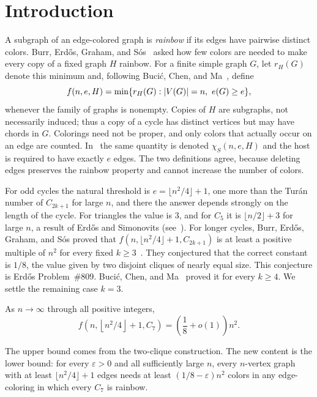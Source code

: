 \section{Introduction}\label{sec:introduction}
A subgraph of an edge-colored graph is \emph{rainbow} if its edges have pairwise distinct colors. Burr, Erd\H{o}s, Graham, and S\'os~\cite{BEGS1989} asked how few colors are needed to make every copy of a fixed graph $H$ rainbow. For a finite simple graph $G$, let $r_H(G)$ denote this minimum and, following Buci\'c, Chen, and Ma~\cite{BCM2026}, define
\begin{equation}\label{eq:fdefinition}
 f(n,e,H)=\min\{r_H(G):\lvert V(G)\rvert=n,\ e(G)\ge e\},
\end{equation}
whenever the family of graphs is nonempty. Copies of $H$ are subgraphs, not necessarily induced; thus a copy of a cycle has distinct vertices but may have chords in $G$. Colorings need not be proper, and only colors that actually occur on an edge are counted. In~\cite{BEGS1989} the same quantity is denoted $\chi_S(n,e,H)$ and the host is required to have exactly $e$ edges. The two definitions agree, because deleting edges preserves the rainbow property and cannot increase the number of colors.

For odd cycles the natural threshold is $e=\lfloor n^2/4\rfloor+1$, one more than the Tur\'an number of $C_{2k+1}$ for large $n$, and there the answer depends strongly on the length of the cycle. For triangles the value is $3$, and for $C_5$ it is $\lfloor n/2\rfloor+3$ for large $n$, a result of Erd\H{o}s and Simonovits (see~\cite{BEGS1989,BCM2026}). For longer cycles, Burr, Erd\H{o}s, Graham, and S\'os proved that $f(n,\lfloor n^2/4\rfloor+1,C_{2k+1})$ is at least a positive multiple of $n^2$ for every fixed $k\ge3$~\cite[Theorem~5.1]{BEGS1989}. They conjectured that the correct constant is $1/8$, the value given by two disjoint cliques of nearly equal size. This conjecture is Erd\H{o}s Problem~\#809. Buci\'c, Chen, and Ma~\cite{BCM2026} proved it for every $k\ge4$. We settle the remaining case $k=3$.

\begin{theorem}\label{thm:main}
As $n\to\infty$ through all positive integers,
\begin{equation}\label{eq:main}
 f\left(n,\left\lfloor n^2/4\right\rfloor+1,C_7\right)
 =\left(\frac18+o(1)\right)n^2.
\end{equation}
\end{theorem}

The upper bound comes from the two-clique construction. The new content is the lower bound: for every $\varepsilon>0$ and all sufficiently large $n$, every $n$-vertex graph with at least $\lfloor n^2/4\rfloor+1$ edges needs at least $(1/8-\varepsilon)n^2$ colors in any edge-coloring in which every $C_7$ is rainbow.

